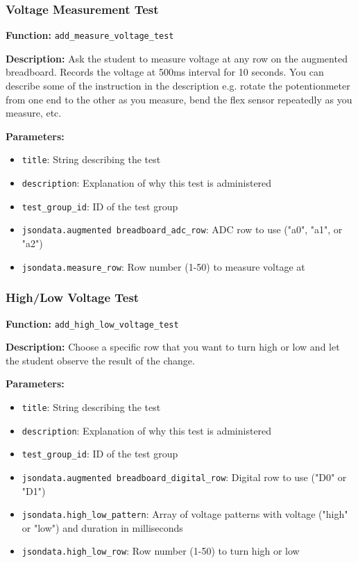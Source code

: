 \subsubsection{Voltage Measurement Test}
\textbf{Function:} \texttt{add\_measure\_voltage\_test}

\textbf{Description:} Ask the student to measure voltage at any row on the augmented breadboard. Records the voltage at 500ms interval for 10 seconds. You can describe some of the instruction in the description e.g. rotate the potentionmeter from one end to the other as you measure, bend the flex sensor repeatedly as you measure, etc.

\textbf{Parameters:}
\begin{itemize}
    \item \texttt{title}: String describing the test
    \item \texttt{description}: Explanation of why this test is administered
    \item \texttt{test\_group\_id}: ID of the test group
    \item \texttt{jsondata.augmented breadboard\_adc\_row}: ADC row to use ("a0", "a1", or "a2")
    \item \texttt{jsondata.measure\_row}: Row number (1-50) to measure voltage at
\end{itemize}

\subsubsection{High/Low Voltage Test}
\textbf{Function:} \texttt{add\_high\_low\_voltage\_test}

\textbf{Description:} Choose a specific row that you want to turn high or low and let the student observe the result of the change.

\textbf{Parameters:}
\begin{itemize}
    \item \texttt{title}: String describing the test
    \item \texttt{description}: Explanation of why this test is administered
    \item \texttt{test\_group\_id}: ID of the test group
    \item \texttt{jsondata.augmented breadboard\_digital\_row}: Digital row to use ("D0" or "D1")
    \item \texttt{jsondata.high\_low\_pattern}: Array of voltage patterns with voltage ("high" or "low") and duration in milliseconds
    \item \texttt{jsondata.high\_low\_row}: Row number (1-50) to turn high or low
\end{itemize}


